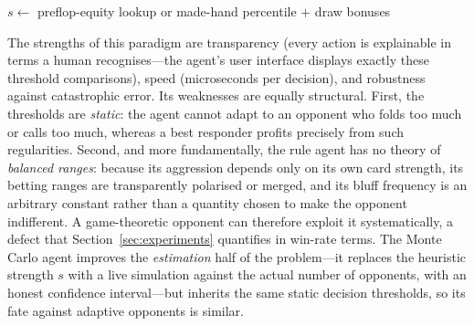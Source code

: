 \begin{algorithm}[htbp]
\DontPrintSemicolon
\caption{Rule-based decision at one betting node (our \emph{rule agent}; rules are priority-ordered, first match fires).}\label{alg:rule}
$s \leftarrow$ preflop-equity lookup or made-hand percentile $+$ draw bonuses\;
\end{algorithm}

The strengths of this paradigm are transparency (every action is explainable in terms a human recognises---the agent's user interface displays exactly these threshold comparisons), speed (microseconds per decision), and robustness against catastrophic error. Its weaknesses are equally structural. First, the thresholds are \emph{static}: the agent cannot adapt to an opponent who folds too much or calls too much, whereas a best responder profits precisely from such regularities. Second, and more fundamentally, the rule agent has no theory of \emph{balanced ranges}: because its aggression depends only on its own card strength, its betting ranges are transparently polarised or merged, and its bluff frequency is an arbitrary constant rather than a quantity chosen to make the opponent indifferent. A game-theoretic opponent can therefore exploit it systematically, a defect that Section~\ref{sec:experiments} quantifies in win-rate terms. The Monte Carlo agent improves the \emph{estimation} half of the problem---it replaces the heuristic strength $s$ with a live simulation against the actual number of opponents, with an honest confidence interval---but inherits the same static decision thresholds, so its fate against adaptive opponents is similar.

